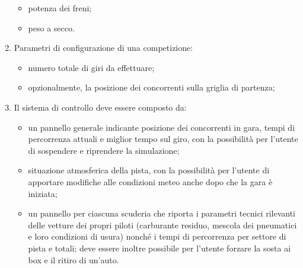 \begin{enumerate}
\begin{itemize}
        \item potenza dei freni;
        \item peso a secco.
        \end{itemize}
\item Parametri di configurazione di una competizione:
        \begin{itemize}
        \item numero totale di giri da effettuare;
        \item opzionalmente, la posizione dei concorrenti sulla griglia di partenza;
        \end{itemize}
\item Il sistema di controllo deve essere composto da:
        \begin{itemize}
        \item un pannello generale indicante posizione dei concorrenti in gara, tempi di percorrenza attuali e miglior tempo sul giro, con la possibilità per l'utente di sospendere e riprendere la simulazione;
        \item situazione atmosferica della pista, con la possibilità per l'utente di apportare modifiche alle condizioni meteo anche dopo che la gara è iniziata;
        \item un pannello per ciascuna scuderia che riporta i parametri tecnici rilevanti delle vetture dei propri piloti (carburante residuo, mescola dei pneumatici e loro condizioni di usura) nonché i tempi di percorrenza per settore di pista e totali; deve essere inoltre possibile per l'utente forzare la sosta ai box e il ritiro di un'auto.
        \end{itemize}
\end{enumerate}
